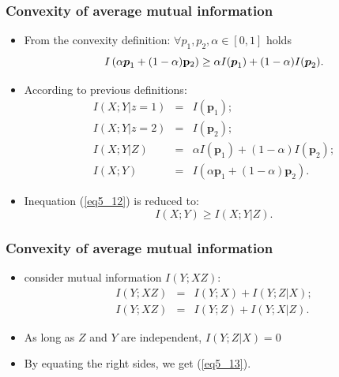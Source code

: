 \documentclass[14pt]{beamer}
\renewcommand{\vec}[1]{\ensuremath{\boldsymbol{#1}}}
\begin{document}
\begin{frame}
\frametitle{Convexity of average mutual information}
\begin{itemize}

    \item From the convexity definition: $\forall p_1, p_2, \alpha \in [0,1]$ holds
    \begin{equation} \label{eq5_12}
        I\left( {\alpha {\vec p}_1 + (1 - \alpha ) {\rm {\bf p}}_2 } \right) 
        \ge \alpha I({\vec p}_1 ) + (1 - \alpha ) I ({\vec p}_2 ).
    \end{equation}
    
    \item According to previous definitions:
    \[
    \begin{array}{lll}
        I(X;Y\vert z = 1) &=& I({\vec p}_1 );\\
        I(X;Y\vert z = 2) &=& I({\vec p}_2 );\\
        I(X;Y\vert Z) &=& \alpha I({\vec p}_1 ) + (1 - \alpha )%
        I({\vec p}_2 );\\
        I(X;Y) &=& I\left( {\alpha {\vec p}_1 + (1 - \alpha ){\vec p}_2 } \right).
    \end{array}
    \]
    
    \item Inequation (\ref{eq5_12}) is reduced to:
    \begin{equation}
        \label{eq5_13} I(X;Y) \ge I(X;Y\vert Z).
    \end{equation}
    

\end{itemize}
\end{frame}


\begin{frame}
\frametitle{Convexity of average mutual information}
\begin{itemize}


    \item consider mutual information $I(Y;XZ)$:
    \begin{eqnarray}
        \label{eq5_14} I(Y;XZ) &=& I(Y;X) + I(Y;Z\vert X); \\
        \label{eq5_15} I(Y;XZ) &=& I(Y;Z) + I(Y;X\vert Z).
    \end{eqnarray}
    
    \item As long as $Z$ and $Y$ are independent, $I(Y;Z\vert X) = 0$
    
    \item By equating the right sides, we get (\ref{eq5_13}). \QED


\end{itemize}
\end{frame}
\end{document}
